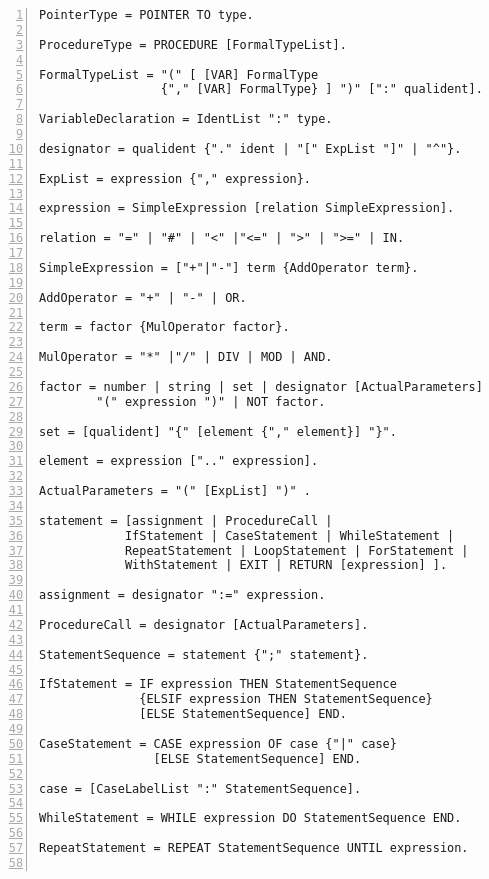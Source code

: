 \begin{Verbatim}[numbers=left]
PointerType = POINTER TO type.

ProcedureType = PROCEDURE [FormalTypeList].

FormalTypeList = "(" [ [VAR] FormalType
                 {"," [VAR] FormalType} ] ")" [":" qualident].
                 
VariableDeclaration = IdentList ":" type.

designator = qualident {"." ident | "[" ExpList "]" | "^"}.

ExpList = expression {"," expression}.

expression = SimpleExpression [relation SimpleExpression].

relation = "=" | "#" | "<" |"<=" | ">" | ">=" | IN.

SimpleExpression = ["+"|"-"] term {AddOperator term}.

AddOperator = "+" | "-" | OR.

term = factor {MulOperator factor}.

MulOperator = "*" |"/" | DIV | MOD | AND.

factor = number | string | set | designator [ActualParameters] |
        "(" expression ")" | NOT factor.
        
set = [qualident] "{" [element {"," element}] "}".

element = expression [".." expression].

ActualParameters = "(" [ExpList] ")" .

statement = [assignment | ProcedureCall |
            IfStatement | CaseStatement | WhileStatement |
            RepeatStatement | LoopStatement | ForStatement |
            WithStatement | EXIT | RETURN [expression] ].
            
assignment = designator ":=" expression.

ProcedureCall = designator [ActualParameters].

StatementSequence = statement {";" statement}.

IfStatement = IF expression THEN StatementSequence
              {ELSIF expression THEN StatementSequence}
              [ELSE StatementSequence] END.
              
CaseStatement = CASE expression OF case {"|" case}
                [ELSE StatementSequence] END.
                
case = [CaseLabelList ":" StatementSequence].

WhileStatement = WHILE expression DO StatementSequence END.

RepeatStatement = REPEAT StatementSequence UNTIL expression.


\end{Verbatim}
